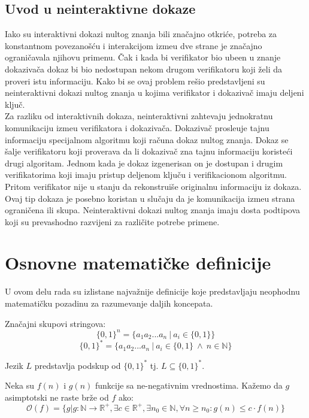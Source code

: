 \subsection{Uvod u neinteraktivne dokaze}
Iako su interaktivni dokazi nultog znanja  bili zna\v cajno otkri\' ce, potreba za konstantnom povezano\v s\' cu i interakcijom izme\dj u dve strane je zna\v cajno ograni\v cavala njihovu primenu. \v Cak i kada bi verifikator bio ube\dj en u znanje dokaziva\v ca dokaz bi bio nedostupan nekom drugom verifikatoru koji \v zeli da proveri istu informaciju. Kako bi se ovaj problem re\v sio predstavljeni su neinteraktivni dokazi nultog znanja u kojima verifikator i dokaziva\v c imaju deljeni klju\v c. \\
Za razliku od interaktivnih dokaza, neinteraktivni zahtevaju jednokratnu komunikaciju izme\dj u verifikatora i dokaziva\v ca. Dokaziva\v c prosle\dj uje tajnu informaciju specijalnom algoritmu koji ra\v cuna dokaz nultog znanja. Dokaz se \v salje verifikatoru koji proverava da li dokaziva\v c zna tajnu informaciju koriste\' ci drugi algoritam. Jednom kada je dokaz izgenerisan on je dostupan i drugim verifikatorima koji imaju pristup deljenom klju\v cu i verifikacionom algoritmu. Pritom verifikator nije u stanju da rekonstrui\v se originalnu informaciju iz dokaza.\\
Ovaj tip dokaza je posebno koristan u slu\v caju da je komunikacija izme\dj u strana ograni\v cena ili skupa. Neinteraktivni dokazi nultog znanja imaju dosta podtipova koji su prevas{}hodno razvijeni za razli\v cite potrebe primene.

\section{Osnovne matemati\v cke definicije}
U ovom delu rada su izlistane najvažnije definicije koje predstavljaju neophodnu matematičku pozadinu za razumevanje daljih koncepata\cite{neglf}.
\begin{definition} 
	Značajni skupovi stringova:
	$$\{0,1\}^{n} = \{a_{1}a_{2}...a_{n}\ |\ a_{i}\in \{0,1\}\}$$
	$$\{0,1\}^{*} = \{a_{1}a_{2}...a_{n}\ |\ a_{i}\in \{0,1\}\ \land \ n\in \mathbb{N}\}$$
\end{definition}


\begin{definition} 
	Jezik $L$ predstavlja podskup od $\{0,1\}^{*}$ tj. $L \subseteq \{0,1\}^{*}$.
\end{definition}


\begin{definition} 
	Neka su $f(n)$ i $g(n)$ funkcije sa ne-negativnim vrednostima. Kažemo da $g$ asimptotski ne raste br\v ze od $f$ ako: $${\mathcal {O}}(f)=\{g|g:\mathbb{N} \rightarrow \mathbb{R} ^{+},\exists c\in \mathbb{R} ^{+} , \exists n_{0}\in \mathbb{N} ,\forall n\geq n_{0}:g(n)\leq c\cdot f(n)\}$$
\end{definition}

